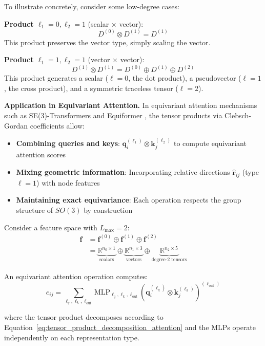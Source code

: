 \begin{example}\label{ex:low_degree_clebsch_gordan}
To illustrate concretely, consider some low-degree cases:

\textbf{Product $\ell_1 = 0, \ell_2 = 1$} (scalar $\times$ vector):
\begin{equation}
D^{(0)} \otimes D^{(1)} = D^{(1)}
\end{equation}
This product preserves the vector type, simply scaling the vector.

\textbf{Product $\ell_1 = 1, \ell_2 = 1$} (vector $\times$ vector):
\begin{equation}
D^{(1)} \otimes D^{(1)} = D^{(0)} \oplus D^{(1)} \oplus D^{(2)}
\end{equation}
This product generates a scalar ($\ell=0$, the dot product), a pseudovector ($\ell=1$, the cross product), and a symmetric traceless tensor ($\ell=2$).
\end{example}

\textbf{Application in Equivariant Attention.} In equivariant attention mechanisms such as SE(3)-Transformers \citep{fuchs2020se3transformers} and Equiformer \citep{liao2022equiformer}, the tensor products via Clebsch-Gordan coefficients allow:
\begin{itemize}
    \item \textbf{Combining queries and keys}: $\mathbf{q}_i^{(\ell_1)} \otimes \mathbf{k}_j^{(\ell_2)}$ to compute equivariant attention scores
    \item \textbf{Mixing geometric information}: Incorporating relative directions $\hat{\mathbf{r}}_{ij}$ (type $\ell=1$) with node features
    \item \textbf{Maintaining exact equivariance}: Each operation respects the group structure of $SO(3)$ by construction
\end{itemize}

\begin{example}\label{ex:feature_space_decomposition}
Consider a feature space with $L_{\max} = 2$:
\begin{align}
\mathbf{f} &= \mathbf{f}^{(0)} \oplus \mathbf{f}^{(1)} \oplus \mathbf{f}^{(2)} \\
&= \underbrace{\mathbb{R}^{n_0 \times 1}}_{\text{scalars}} \oplus \underbrace{\mathbb{R}^{n_1 \times 3}}_{\text{vectors}} \oplus \underbrace{\mathbb{R}^{n_2 \times 5}}_{\text{degree-2 tensors}}
\label{eq:feature_space_example}
\end{align}

An equivariant attention operation computes:
\begin{equation}
e_{ij} = \sum_{\ell_q, \ell_k, \ell_{\text{out}}} \text{MLP}_{\ell_q, \ell_k, \ell_{\text{out}}} \left( \mathbf{q}_i^{(\ell_q)} \otimes \mathbf{k}_j^{(\ell_k)} \right)^{(\ell_{\text{out}})}
\label{eq:equivariant_attention_score_irreps}
\end{equation}

where the tensor product decomposes according to Equation~\eqref{eq:tensor_product_decomposition_attention} and the MLPs operate independently on each representation type.
\end{example}

